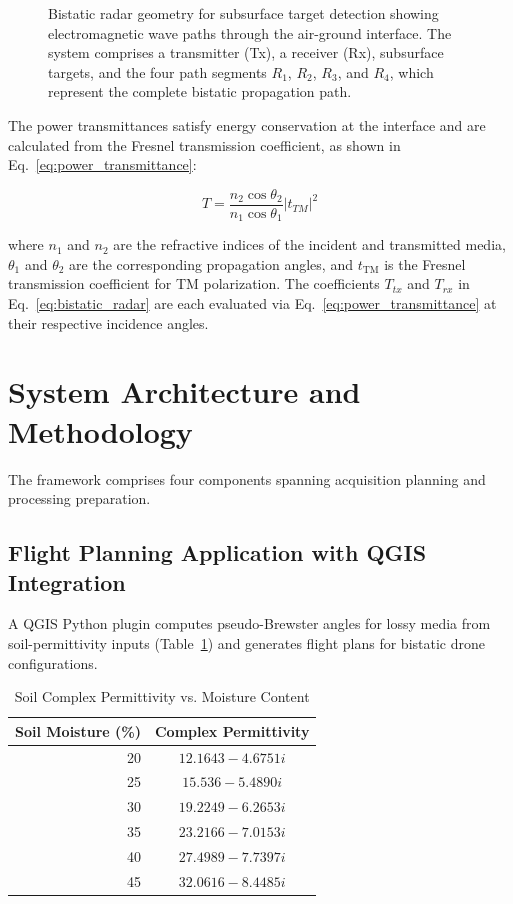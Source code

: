 \documentclass[conference]{IEEEtran}
\begin{document}
\begin{figure}[ht]
\centering
\scalebox{0.6}{}
\caption{Bistatic radar geometry for subsurface target detection showing electromagnetic wave paths through the air-ground interface. The system comprises a transmitter (Tx), a receiver (Rx), subsurface targets, and the four path segments $R_1$, $R_2$, $R_3$, and $R_4$, which represent the complete bistatic propagation path.}
\label{fig:bistatic_geometry}
\end{figure}

The power transmittances satisfy energy conservation at the interface and are calculated from the Fresnel transmission coefficient, as shown in Eq.~\ref{eq:power_transmittance}:

\begin{equation}
T = \frac{n_2 \cos \theta_2}{n_1 \cos \theta_1} |t_{TM}|^2
\label{eq:power_transmittance}
\end{equation}

where $n_1$ and $n_2$ are the refractive indices of the incident and transmitted media, $\theta_1$ and $\theta_2$ are the corresponding propagation angles, and $t_{\mathrm{TM}}$ is the Fresnel transmission coefficient for TM polarization. The coefficients $T_{tx}$ and $T_{rx}$ in Eq.~\ref{eq:bistatic_radar} are each evaluated via Eq.~\ref{eq:power_transmittance} at their respective incidence angles.

\section{System Architecture and Methodology}

The framework comprises four components spanning acquisition planning and processing preparation.

\subsection{Flight Planning Application with QGIS Integration}

A QGIS Python plugin computes pseudo-Brewster angles for lossy media from soil-permittivity inputs (Table~\ref{tab:soil_permittivity}) and generates flight plans for bistatic drone configurations.

\begin{table}[hbt]
\centering
\caption{Soil Complex Permittivity vs. Moisture Content}
\label{tab:soil_permittivity}
\begin{tabular}{rc}
\toprule
\textbf{Soil Moisture (\%)} & \textbf{Complex Permittivity} \\
\midrule
20 & $12.1643 - 4.6751i$ \\
25 & $15.536 - 5.4890i$ \\
30 & $19.2249 - 6.2653i$ \\
35 & $23.2166 - 7.0153i$ \\
40 & $27.4989 - 7.7397i$ \\
45 & $32.0616 - 8.4485i$ \\
\bottomrule
\end{tabular}
\end{table}
\end{document}

